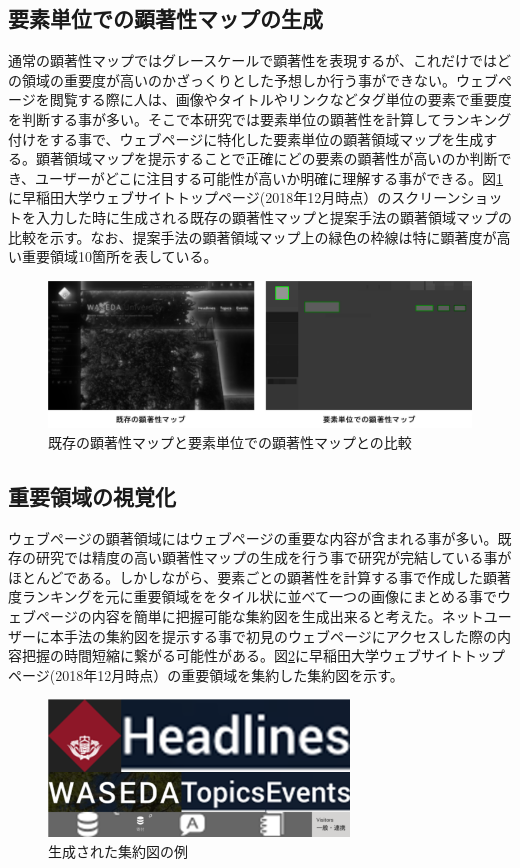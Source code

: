 \subsection{要素単位での顕著性マップの生成}
\par 通常の顕著性マップではグレースケールで顕著性を表現するが、これだけではどの領域の重要度が高いのかざっくりとした予想しか行う事ができない。ウェブページを閲覧する際に人は、画像やタイトルやリンクなどタグ単位の要素で重要度を判断する事が多い。そこで本研究では要素単位の顕著性を計算してランキング付けをする事で、ウェブページに特化した要素単位の顕著領域マップを生成する。顕著領域マップを提示することで正確にどの要素の顕著性が高いのか判断でき、ユーザーがどこに注目する可能性が高いか明確に理解する事ができる。図\ref{fig_comparesaliency}に早稲田大学ウェブサイトトップページ(2018年12月時点）\cite{waseda_top}のスクリーンショットを入力した時に生成される既存の顕著性マップと提案手法の顕著領域マップの比較を示す。なお、提案手法の顕著領域マップ上の緑色の枠線は特に顕著度が高い重要領域10箇所を表している。

\begin{figure}[H]
    \centering
    \includegraphics[width=12cm]{figures/example-originalsaliencymap.png}
    \caption{既存の顕著性マップと要素単位での顕著性マップとの比較}
    \label{fig_comparesaliency}
\end{figure}

\subsection{重要領域の視覚化}
\par ウェブページの顕著領域にはウェブページの重要な内容が含まれる事が多い。既存の研究では精度の高い顕著性マップの生成を行う事で研究が完結している事がほとんどである。しかしながら、要素ごとの顕著性を計算する事で作成した顕著度ランキングを元に重要領域ををタイル状に並べて一つの画像にまとめる事でウェブページの内容を簡単に把握可能な集約図を生成出来ると考えた。ネットユーザーに本手法の集約図を提示する事で初見のウェブページにアクセスした際の内容把握の時間短縮に繋がる可能性がある。図\ref{fig_imoortanceregion}に早稲田大学ウェブサイトトップページ(2018年12月時点）\cite{waseda_top}の重要領域を集約した集約図を示す。

\begin{figure}[H]
    \centering
    \includegraphics[width=8cm]{figures/example-importanceregion.png}
    \caption{生成された集約図の例}
    \label{fig_imoortanceregion}
\end{figure}
